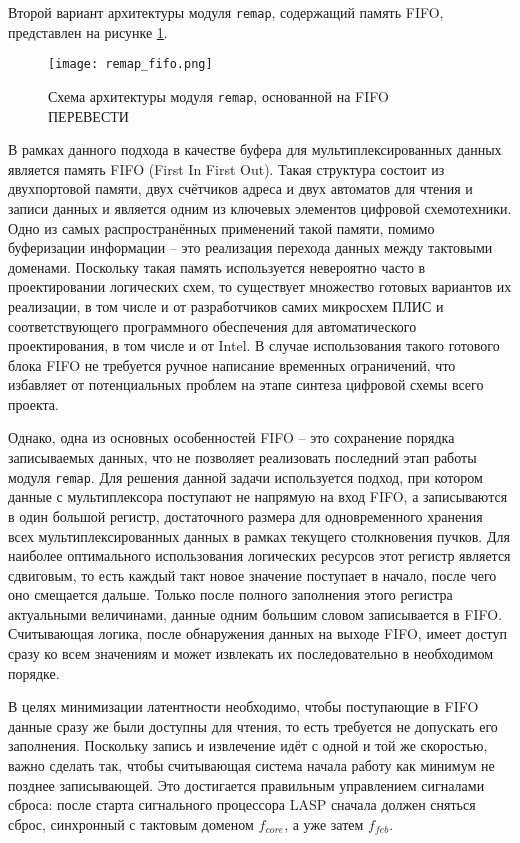 Второй вариант архитектуры модуля \texttt{remap}, содержащий память FIFO, представлен на рисунке \ref{fig:remap_fifo}.\par
\begin{figure}[ht]
    \centering
    \texttt{[image: remap\_fifo.png]}
    \caption{Схема архитектуры модуля \texttt{remap}, основанной на FIFO ПЕРЕВЕСТИ}
    \label{fig:remap_fifo}
\end{figure}\par
В рамках данного подхода в качестве буфера для мультиплексированных данных является память FIFO (First In First Out). Такая структура состоит из двухпортовой памяти, двух счётчиков адреса и двух автоматов для чтения и записи данных и является одним из ключевых элементов цифровой схемотехники. Одно из самых распространённых применений такой памяти, помимо буферизации информации -- это реализация перехода данных между тактовыми доменами. Поскольку такая память используется невероятно часто в проектировании логических схем, то существует множество готовых вариантов их реализации, в том числе и от разработчиков самих микросхем ПЛИС и соответствующего программного обеспечения для автоматического проектирования, в том числе и от Intel. В случае использования такого готового блока FIFO не требуется ручное написание временных ограничений, что избавляет от потенциальных проблем на этапе синтеза цифровой схемы всего проекта.\par
Однако, одна из основных особенностей FIFO -- это сохранение порядка записываемых данных, что не позволяет реализовать последний этап работы модуля \texttt{remap}. Для решения данной задачи используется подход, при котором данные с мультиплексора поступают не напрямую на вход FIFO, а записываются в один большой регистр, достаточного размера для одновременного хранения всех мультиплексированных данных в рамках текущего столкновения пучков. Для наиболее оптимального использования логических ресурсов этот регистр является сдвиговым, то есть каждый такт новое значение поступает в начало, после чего оно смещается дальше. Только после полного заполнения этого регистра актуальными величинами, данные одним большим словом записывается в FIFO. Считывающая логика, после обнаружения данных на выходе FIFO, имеет доступ сразу ко всем значениям и может извлекать их последовательно в необходимом порядке.\par
В целях минимизации латентности необходимо, чтобы поступающие в FIFO данные сразу же были доступны для чтения, то есть требуется не допускать его заполнения. Поскольку запись и извлечение идёт с одной и той же скоростью, важно сделать так, чтобы считывающая система начала работу как минимум не позднее записывающей. Это достигается правильным управлением сигналами сброса: после старта сигнального процессора LASP сначала должен сняться сброс, синхронный с тактовым доменом $f_{core}$, а уже затем $f_{feb}$.\par
